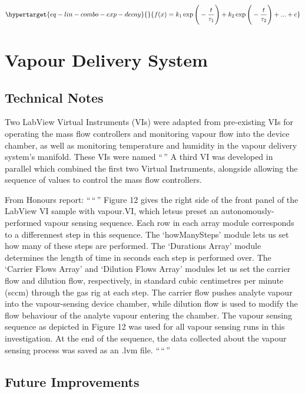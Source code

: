 \documentclass[
  a4paper,
]{scrbook}
\begin{document}
\begin{equation}\protect\hypertarget{eq-lin-combo-exp-decay}{}{
f(x) = k_1\exp{\Bigg(-\frac{t}{{\tau}_{1}}\Bigg)} + k_2\exp{\Bigg(-\frac{t}{{\tau}_{2}}\Bigg)} + ... + c
}\label{eq-lin-combo-exp-decay}\end{equation}

\hypertarget{vapour-delivery-system}{%
\chapter{Vapour Delivery System}\label{vapour-delivery-system}}

\hypertarget{technical-notes}{%
\section{Technical Notes}\label{technical-notes}}

Two LabView Virtual Instruments (VIs) were adapted from pre-existing VIs
for operating the mass flow controllers and monitoring vapour flow into
the device chamber, as well as monitoring temperature and humidity in
the vapour delivery system's manifold. These VIs were named ``\,'' A
third VI was developed in parallel which combined the first two Virtual
Instruments, alongside allowing the sequence of values to control the
mass flow controllers.

From Honours report: ``\,``\,'' Figure 12 gives the right side of the
front panel of the LabView VI sample with vapour.VI, which letsus preset
an autonomously-performed vapour sensing sequence. Each row in each
array module corresponds to a differennest step in this sequence. The
`howManySteps' module lets us set how many of these steps are performed.
The `Durations Array' module determines the length of time in seconds
each step is performed over. The `Carrier Flows Array' and `Dilution
Flows Array' modules let us set the carrier flow and dilution flow,
respectively, in standard cubic centimetres per minute (sccm) through
the gas rig at each step. The carrier flow pushes analyte vapour into
the vapour-sensing device chamber, while dilution flow is used to modify
the flow behaviour of the analyte vapour entering the chamber. The
vapour sensing sequence as depicted in Figure 12 was used for all vapour
sensing runs in this investigation. At the end of the sequence, the data
collected about the vapour sensing process was saved as an .lvm file.
``\,``\,''

\hypertarget{future-improvements}{%
\section{Future Improvements}\label{future-improvements}}


\backmatter
\printbibliography
\end{document}
